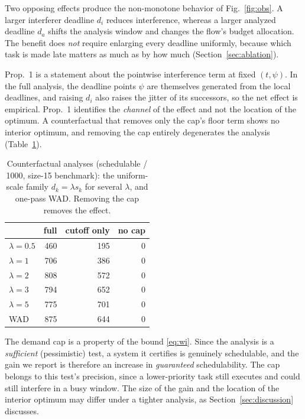 \documentclass[conference]{IEEEtran}
\begin{document}
Two opposing effects produce the non-monotone behavior of Fig.~\ref{fig:obs}.
A larger interferer deadline $d_i$ reduces interference, whereas a larger analyzed
deadline $d_a$ shifts the analysis window and changes the flow's budget
allocation. The benefit does \emph{not} require enlarging every deadline
uniformly, because which task is made late matters as much as by how much
(Section~\ref{sec:ablation}).

Prop.~1 is a statement about the pointwise interference term at fixed $(t,\psi)$.
In the full analysis, the deadline points $\psi$ are themselves generated from
the local deadlines, and raising $d_i$ also raises the jitter of its successors,
so the net effect is empirical. Prop.~1 identifies the \emph{channel} of the
effect and not the location of the optimum. A counterfactual that removes only
the cap's floor term shows no interior optimum, and removing the cap entirely
degenerates the analysis (Table~\ref{tab:cf}).

\begin{table}[t]
\centering
\caption{Counterfactual analyses (schedulable / 1000, size-15 benchmark): the
uniform-scale family $d_k=\lambda s_k$ for several $\lambda$, and one-pass WAD.
Removing the cap removes the effect.}
\label{tab:cf}
\begin{tabular}{lrrr}
\toprule
 & full & cutoff only & no cap \\
\midrule
$\lambda=0.5$ & 460 & 195 & 0 \\
$\lambda=1$   & 706 & 386 & 0 \\
$\lambda=2$   & 808 & 572 & 0 \\
$\lambda=3$   & 794 & 652 & 0 \\
$\lambda=5$   & 775 & 701 & 0 \\
WAD           & 875 & 644 & 0 \\
\bottomrule
\end{tabular}
\end{table}

The demand cap is a property of the bound \eqref{eq:wi}. Since the analysis is a
\emph{sufficient} (pessimistic) test, a system it certifies is genuinely
schedulable, and the gain we report is therefore an increase in \emph{guaranteed}
schedulability. The cap belongs to this test's precision, since a lower-priority
task still executes and could still interfere in a busy window. The size of the
gain and the location of the interior optimum may differ under a tighter
analysis, as Section~\ref{sec:discussion} discusses.
\end{document}
